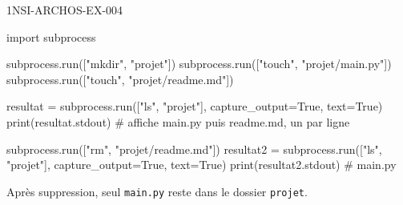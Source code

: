 \begin{corrige}{1NSI-ARCHOS-EX-004}
\begin{python}
import subprocess

subprocess.run(["mkdir", "projet"])
subprocess.run(["touch", "projet/main.py"])
subprocess.run(["touch", "projet/readme.md"])

resultat = subprocess.run(["ls", "projet"], capture_output=True, text=True)
print(resultat.stdout)  # affiche main.py puis readme.md, un par ligne

subprocess.run(["rm", "projet/readme.md"])
resultat2 = subprocess.run(["ls", "projet"], capture_output=True, text=True)
print(resultat2.stdout)  # main.py
\end{python}
Après suppression, seul \lstinline{main.py} reste dans le dossier \lstinline{projet}.
\end{corrige}
